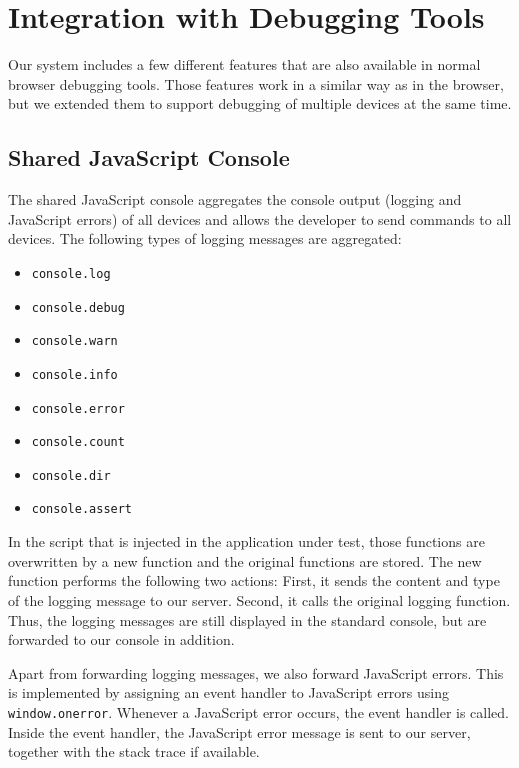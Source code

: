 \section{Integration with Debugging Tools}

Our system includes a few different features that are also available in normal browser debugging tools. Those features work in a similar way as in the browser, but we extended them to support debugging of multiple devices at the same time.

\subsection{Shared JavaScript Console}

The shared JavaScript console aggregates the console output (logging and JavaScript errors) of all devices and allows the developer to send commands to all devices. The following types of logging messages are aggregated:
\begin{itemize}
	\item \lstinline|console.log|
	\item \lstinline|console.debug|
	\item \lstinline|console.warn|
	\item \lstinline|console.info|
	\item \lstinline|console.error|
	\item \lstinline|console.count|
	\item \lstinline|console.dir|
	\item \lstinline|console.assert|
\end{itemize}
In the script that is injected in the application under test, those functions are overwritten by a new function and the original functions are stored. The new function performs the following two actions: First, it sends the content and type of the logging message to our server. Second, it calls the original logging function. Thus, the logging messages are still displayed in the standard console, but are forwarded to our console in addition.

Apart from forwarding logging messages, we also forward JavaScript errors. This is implemented by assigning an event handler to JavaScript errors using \lstinline|window.onerror|. Whenever a JavaScript error occurs, the event handler is called. Inside the event handler, the JavaScript error message is sent to our server, together with the stack trace if available. 

